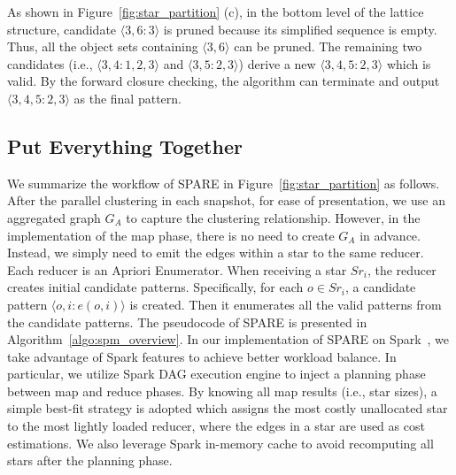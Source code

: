 \begin{example}
As shown in Figure~\ref{fig:star_partition} (c), in the bottom level of the lattice structure, candidate $\langle 3,6:3 \rangle $ is pruned because its simplified sequence is empty. Thus, all the object sets containing $\langle 3,6 \rangle $ can be pruned. The remaining two candidates (i.e., $\langle 3,4:1,2,3 \rangle$ and $\langle 3,5:2,3 \rangle$)  derive a new  $\langle 3,4,5:2,3 \rangle$ which is valid. By the forward closure checking, the algorithm can terminate and output $\langle 3,4,5:2,3 \rangle$ as the final pattern.
\end{example}


\subsection{Put Everything Together}
We summarize the workflow of SPARE in Figure~\ref{fig:star_partition} as follows. After the parallel clustering in each snapshot, for ease of presentation, we use an aggregated graph $G_A$ to capture the clustering relationship. However, in the implementation of the map phase, there is no need to create $G_A$ in advance. Instead, we simply need to emit the edges within a star to the same reducer. 
Each reducer is an Apriori Enumerator. When receiving a star $Sr_i$, the reducer creates initial candidate patterns. Specifically, for each $o \in Sr_i$, a candidate pattern $\langle o,i: e(o,i) \rangle$ is created. Then it enumerates all the valid patterns from the candidate patterns. The pseudocode of SPARE is presented in Algorithm~\ref{algo:spm_overview}. 
In our implementation of SPARE on Spark~\cite{zaharia2012resilient}, we take advantage of Spark features to achieve better workload balance. In particular,
we utilize Spark DAG execution engine to inject a planning phase between map and reduce phases. By knowing all map results (i.e., star sizes), a simple best-fit strategy is adopted which assigns the most costly unallocated star to the most lightly loaded reducer, where the edges in a star are used as cost estimations. We also leverage Spark in-memory cache to avoid recomputing all stars after the planning phase.
% 

